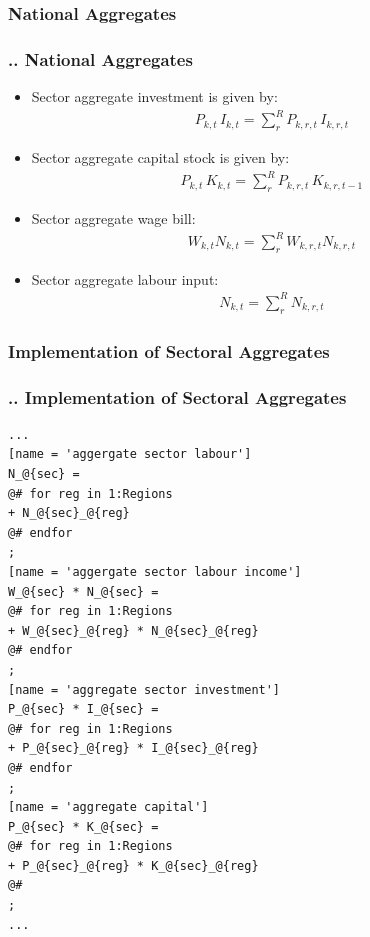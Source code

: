 \documentclass[11pt,aspectratio=169]{beamer}
\begin{document}
\subsubsection{National Aggregates}
\begin{frame}
\frametitle{{\thesection.\thesubsection.\thesubsubsection} National Aggregates}
\scriptsize
\begin{itemize}
\item Sector aggregate investment is given by:
\begin{align*}
P_{k,t} \, I_{k,t} = \sum_{r}^{R} P_{k,r,t} \, I_{k,r,t}
\end{align*}
\item Sector aggregate capital stock is given by:
\begin{align*}
P_{k,t} \, K_{k,t} = \sum_{r}^{R} P_{k,r,t} \, K_{k,r,t-1}
\end{align*}
\item Sector aggregate wage bill:
\begin{align*}
W_{k,t} N_{k,t} = \sum_{r}^{R}  W_{k,r,t} N_{k,r,t}
\end{align*}
\item Sector aggregate labour input:
\begin{align*}
N_{k,t} = \sum_{r}^{R} N_{k,r,t}
\end{align*}
\end{itemize}
\end{frame}

\subsubsection{Implementation of Sectoral Aggregates}
\begin{frame}[fragile]
\frametitle{{\thesection.\thesubsection.\thesubsubsection} Implementation of Sectoral Aggregates}

\begin{lstlisting}[frame = single]
...
[name = 'aggergate sector labour']
N_@{sec} = 
@# for reg in 1:Regions
+ N_@{sec}_@{reg}
@# endfor
;
[name = 'aggergate sector labour income']
W_@{sec} * N_@{sec} = 
@# for reg in 1:Regions
+ W_@{sec}_@{reg} * N_@{sec}_@{reg}
@# endfor
;
[name = 'aggregate sector investment']
P_@{sec} * I_@{sec} = 
@# for reg in 1:Regions
+ P_@{sec}_@{reg} * I_@{sec}_@{reg}
@# endfor
;
[name = 'aggregate capital']
P_@{sec} * K_@{sec} = 
@# for reg in 1:Regions
+ P_@{sec}_@{reg} * K_@{sec}_@{reg}
@#
;
...
\end{lstlisting}
\end{frame}
\end{document}
